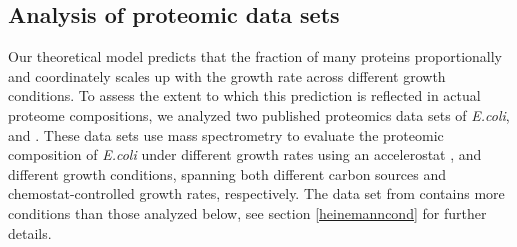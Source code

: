\subsection{Analysis of proteomic data sets}
Our theoretical model predicts that the fraction of many proteins proportionally and coordinately scales up with the growth rate across different growth conditions.
To assess the extent to which this prediction is reflected in actual proteome compositions, we analyzed two published proteomics data sets of \emph{E.coli}, \cite{Peebo_2015} and \cite{Heinemann2015}.
These data sets use mass spectrometry to evaluate the proteomic composition of \emph{E.coli} under \vConds{} different growth rates using an accelerostat \cite{Paalme_1995}, and \hConds{} different growth conditions, spanning both different carbon sources and chemostat-controlled growth rates, respectively.
The data set from \cite{Heinemann2015} contains more conditions than those analyzed below, see section \ref{heinemanncond} for further details.